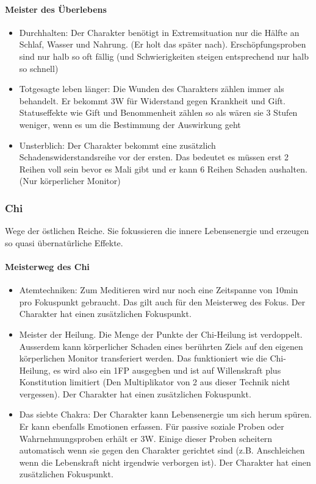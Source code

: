 \documentclass{article}
\begin{document}
\paragraph{Meister des Überlebens}

\begin{itemize}
\item Durchhalten: Der Charakter benötigt in Extremsituation nur die Hälfte an Schlaf, Wasser und Nahrung. (Er holt das später nach). Erschöpfungsproben sind nur halb so oft fällig (und Schwierigkeiten steigen entsprechend nur halb so schnell)
\item Totgesagte leben länger: Die Wunden des Charakters zählen immer als behandelt. Er bekommt 3W für Widerstand gegen Krankheit und Gift. Statuseffekte wie Gift und Benommenheit zählen so als wären sie 3 Stufen weniger, wenn es um die Bestimmung der Auswirkung geht
\item Unsterblich: Der Charakter bekommt eine zusätzlich Schadenswiderstandsreihe vor der ersten. Das bedeutet es müssen erst 2 Reihen voll sein bevor es Mali gibt und er kann 6 Reihen Schaden aushalten. (Nur körperlicher Monitor)
\end{itemize}

\subsubsection{Chi}

Wege der östlichen Reiche. Sie fokussieren die innere Lebensenergie und erzeugen so quasi übernatürliche Effekte.

\paragraph{Meisterweg des Chi}

\begin{itemize}
\item Atemtechniken: Zum Meditieren wird nur noch eine Zeitspanne von 10min pro Fokuspunkt gebraucht. Das gilt auch für den Meisterweg des Fokus. Der Charakter hat einen zusätzlichen Fokuspunkt.
\item Meister der Heilung. Die Menge der Punkte der Chi-Heilung ist verdoppelt. Ausserdem kann körperlicher Schaden eines berührten Ziels auf den eigenen körperlichen Monitor transferiert werden. Das funktioniert wie die Chi-Heilung, es wird also ein 1FP ausgegben und ist auf Willenskraft plus Konstitution limitiert (Den Multiplikator von 2 aus dieser Technik nicht vergessen). Der Charakter hat einen zusätzlichen Fokuspunkt.
\item Das siebte Chakra: Der Charakter kann Lebensenergie um sich herum spüren. Er kann ebenfalls Emotionen erfassen. Für passive soziale Proben oder Wahrnehmungsproben erhält er 3W. Einige dieser Proben scheitern automatisch wenn sie gegen den Charakter gerichtet sind (z.B. Anschleichen wenn die Lebenskraft nicht irgendwie verborgen ist). Der Charakter hat einen zusätzlichen Fokuspunkt.
\end{itemize}
\end{document}
